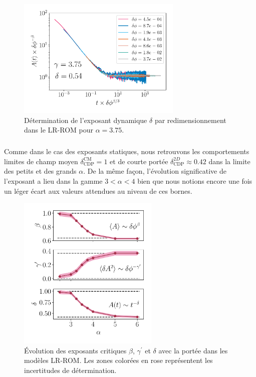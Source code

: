 \begin{figure}[h]
	\centering
	\includegraphics[width=0.7\textwidth]{Chapitre2/Figures/Exposants/DeltaDeter.pdf}
	\caption{Détermination de l'exposant dynamique $\delta$ par redimensionnement dans le LR-ROM pour $\alpha=3.75$.}
	\label{fig:DeltaDeterJumps}
\end{figure}

\subparagraph{}Comme dans le cas des exposants statiques, nous retrouvons les comportements limites de champ moyen $\delta_\text{CDP}^\text{CM}=1$ et de courte portée $\delta_\text{CDP}^{2D} \approx 0.42$ dans la limite des petits et des grands $\alpha$. De la même façon, l'évolution significative de l'exposant a lieu dans la gamme $3<\alpha<4$ bien que nous notions encore une fois un léger écart aux valeurs attendues au niveau de ces bornes.

\begin{figure}[h]
	\centering	\includegraphics[width=0.6\textwidth]{Chapitre2/Figures/Exposants/exp_suspensions_jumps.pdf}
	\caption{Évolution des exposants critiques $\beta$, $\gamma^\prime$ et $\delta$  avec la portée dans les modèles LR-ROM. Les zones colorées en rose représentent les incertitudes de détermination.}
	\label{fig:EvolExpJumps}
\end{figure}


